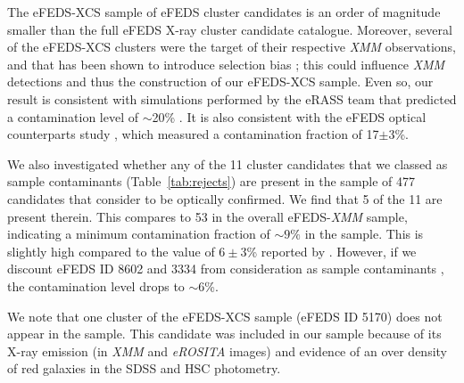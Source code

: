 \documentclass[fleqn,usenatbib]{mnras}
\begin{document}


The eFEDS-XCS sample of eFEDS cluster candidates is an order of magnitude smaller than the full eFEDS X-ray cluster candidate catalogue.
Moreover, several of the eFEDS-XCS clusters were the target of their respective {\em XMM} observations, and that has been shown to introduce selection bias \citep[][]{xcsgiles}; this could influence {\em XMM} detections and thus the construction of our eFEDS-XCS sample. Even so, our result is consistent with simulations performed by the eRASS team that predicted a contamination level of $\sim$20\% \citep{simerass}. It is also consistent with the eFEDS optical counterparts study \citep[][]{efedsclusteropticalcat}, which measured a contamination fraction of 17$\pm 3$\%.

We also investigated whether any of the 11 cluster candidates that we classed as sample contaminants (Table~\ref{tab:rejects}) are present in the sample of 477 candidates that \cite{efedsclusteropticalcat} consider to be optically confirmed. We find that 5 of the 11 are present therein. This compares to 53 in the overall eFEDS-{\em XMM} sample, indicating a minimum contamination fraction of ${\sim}9\%$ in the \cite{efedsclusteropticalcat} sample. This is slightly high compared to the value of $6\pm 3$\% reported by \cite{efedsclusteropticalcat}. However, if we discount eFEDS ID 8602 and 3334 from consideration as sample contaminants \citep[to be more consistent with approach taken in][]{efedsclusteropticalcat}, the contamination level drops to ${\sim}$6\%. 

We note that one cluster of the eFEDS-XCS sample (eFEDS ID 5170) does not appear in the \cite{efedsclusteropticalcat} sample. This candidate was included in our sample because of its X-ray emission (in {\em XMM} and {\em eROSITA} images) and evidence of an over density of red galaxies in the SDSS and HSC photometry.
\end{document}
